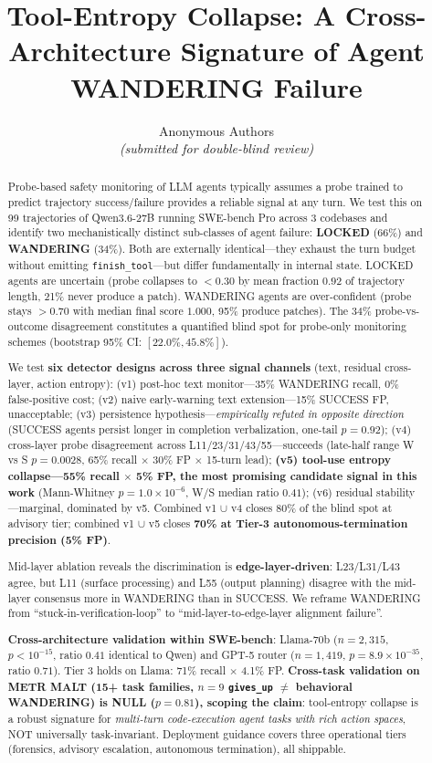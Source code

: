\documentclass[11pt]{article}
\title{Tool-Entropy Collapse: A Cross-Architecture Signature of Agent WANDERING Failure}
\author{Anonymous Authors\\\textit{(submitted for double-blind review)}}
\begin{document}
\maketitle

\begin{abstract}
Probe-based safety monitoring of LLM agents typically assumes a probe trained to predict trajectory success/failure provides a reliable signal at any turn. We test this on 99 trajectories of Qwen3.6-27B running SWE-bench Pro across 3 codebases and identify two mechanistically distinct sub-classes of agent failure: \textbf{LOCKED} (66\%) and \textbf{WANDERING} (34\%). Both are externally identical---they exhaust the turn budget without emitting \texttt{finish\_tool}---but differ fundamentally in internal state. LOCKED agents are uncertain (probe collapses to $<0.30$ by mean fraction $0.92$ of trajectory length, 21\% never produce a patch). WANDERING agents are over-confident (probe stays $>0.70$ with median final score $1.000$, 95\% produce patches). The 34\% probe-vs-outcome disagreement constitutes a quantified blind spot for probe-only monitoring schemes (bootstrap 95\% CI: $[22.0\%, 45.8\%]$).

We test \textbf{six detector designs across three signal channels} (text, residual cross-layer, action entropy): (v1) post-hoc text monitor---35\% WANDERING recall, 0\% false-positive cost; (v2) naive early-warning text extension---15\% SUCCESS FP, unacceptable; (v3) persistence hypothesis---\emph{empirically refuted in opposite direction} (SUCCESS agents persist longer in completion verbalization, one-tail $p = 0.92$); (v4) cross-layer probe disagreement across L11/23/31/43/55---succeeds (late-half range W vs S $p = 0.0028$, 65\% recall $\times$ 30\% FP $\times$ 15-turn lead); \textbf{(v5) tool-use entropy collapse---55\% recall $\times$ 5\% FP, the most promising candidate signal in this work} (Mann-Whitney $p = 1.0\times10^{-6}$, W/S median ratio $0.41$); (v6) residual stability---marginal, dominated by v5. Combined v1 $\cup$ v4 closes 80\% of the blind spot at advisory tier; combined v1 $\cup$ v5 closes \textbf{70\% at Tier-3 autonomous-termination precision (5\% FP)}.

Mid-layer ablation reveals the discrimination is \textbf{edge-layer-driven}: L23/L31/L43 agree, but L11 (surface processing) and L55 (output planning) disagree with the mid-layer consensus more in WANDERING than in SUCCESS. We reframe WANDERING from ``stuck-in-verification-loop'' to ``mid-layer-to-edge-layer alignment failure''.

\textbf{Cross-architecture validation within SWE-bench}: Llama-70b ($n=2{,}315$, $p<10^{-15}$, ratio $0.41$ identical to Qwen) and GPT-5 router ($n=1{,}419$, $p=8.9\times10^{-35}$, ratio $0.71$). Tier 3 holds on Llama: 71\% recall $\times$ 4.1\% FP. \textbf{Cross-task validation on METR MALT (15+ task families, $n=9$ \texttt{gives\_up} $\ne$ behavioral WANDERING) is NULL ($p=0.81$), scoping the claim}: tool-entropy collapse is a robust signature for \emph{multi-turn code-execution agent tasks with rich action spaces}, NOT universally task-invariant. Deployment guidance covers three operational tiers (forensics, advisory escalation, autonomous termination), all shippable.
\end{abstract}
\end{document}
